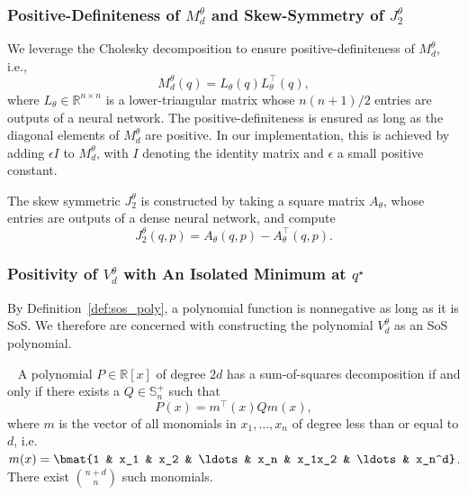 \subsubsection{Positive-Definiteness of $M_d^\theta$ and Skew-Symmetry of $J_2^\theta$}

We leverage the Cholesky decomposition to ensure positive-definiteness of
$M_d^\theta$, i.e.,
%
\begin{equation}
    M_d^\theta(q) = L_{\theta}(q) L_{\theta}^\top(q),
    \label{eq:cholesky}
\end{equation}
%
where $L_\theta \in \mathbb{R}^{n \times n}$ is a lower-triangular matrix whose
$n(n+1)/2$ entries are outputs of a neural network. The positive-definiteness is
ensured as long as the diagonal elements of $M_d^\theta$ are positive. In our
implementation, this is achieved by adding $\epsilon I$ to $M_d^\theta$, with
$I$ denoting the identity matrix and $\epsilon$ a small positive constant.

The skew symmetric $J_2^\theta$ is constructed by taking a square matrix
$A_\theta$, whose entries are outputs of a dense neural network, and compute
%
\begin{equation}
    J_2^\theta(q,p) = A_\theta(q,p) - A_\theta^\top (q,p).
    \label{eq:skew_symmetric}
\end{equation}

\subsubsection{Positivity of $V_d^\theta$ with An Isolated Minimum at $q^\star$}

By Definition~\ref{def:sos_poly}, a polynomial function is nonnegative as long
as it is SoS. We therefore are concerned with constructing the polynomial
$V_d^\theta$ as an SoS polynomial. 
%
\begin{theorem}~\citep{choi1995sums}
    \label{thm:sos}
    A polynomial $P \in \mathbb{R}[x]$ of degree $2d$ has a sum-of-squares
    decomposition if and only if there exists a $Q \in \mathbb{S}^{+}_n$ such
    that
    \begin{equation*}
        P(x) = m^\top(x) Q m(x),
    \end{equation*}
    where $m$ is the vector of all monomials in $x_1, \ldots, x_n$ of
    degree less than or equal to $d$, i.e. $m(x) = \bmat{1 & x_1 & x_2 & \ldots &
    x_n & x_1x_2 & \ldots & x_n^d}$. There exist $\binom{n+d}{n}$ such monomials.
\end{theorem}

